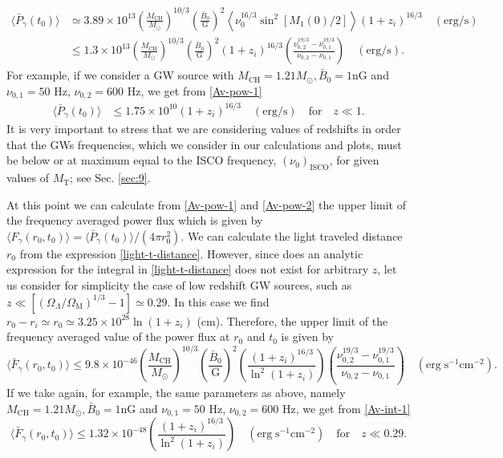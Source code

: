 \documentclass[a4paper,11pt]{article}
\begin{document}
\begin{align}\label{Av-pow-1}
\langle \bar P_\gamma(t_0) \rangle & \simeq 3.89\times 10^{13} \left(\frac{M_\text{CH}}{M_\odot}\right)^{10/3}\left(\frac{\bar B_0}{\text{G}}\right)^2 \left\langle \nu_0^{16/3}\sin^2[M_1(0)/2] \right\rangle (1+z_i)^{16/3} \quad (\text{erg}/\text{s}) \nonumber\\
& \leq 1.3\times 10^{13} \left(\frac{M_\text{CH}}{M_\odot}\right)^{10/3}\left(\frac{\bar B_0}{\text{G}}\right)^2  (1+z_i)^{16/3}\left( \frac{ \nu_{0, 2}^{19/3} - \nu_{0, 1}^{19/3}}{ \nu_{0, 2} - \nu_{0, 1}}\right)      \quad (\text{erg}/\text{s}).
\end{align}
For example, if we consider a GW source with $M_\text{CH}=1.21 M_\odot, \bar B_0=1 \text{nG}$ and $\nu_{0, 1}=50$ Hz, $\nu_{0, 2}=600$ Hz, we get from \eqref{Av-pow-1}
\begin{align}\label{Av-pow-2}
\langle \bar P_\gamma(t_0) \rangle & \leq 1.75\times 10^{10}  (1+z_i)^{16/3}   \quad (\text{erg}/\text{s}) \quad \text{for} \quad z\ll 1.
\end{align}
It is very important to stress that we are considering values of redshifts in order that the GWs frequencies, which we consider in our calculations and plots, must be below or at maximum equal to the ISCO frequency, $(\nu_0)_\text{ISCO}$, for given values of $M_\text{T}$; see Sec. \ref{sec:9}.

At this point we can calculate from \eqref{Av-pow-1} and \eqref{Av-pow-2} the upper limit of the frequency averaged power flux which is given by $\langle F_\gamma(r_0, t_0)\rangle =\langle \bar P_\gamma(t_0) \rangle/(4\pi r_0^2)$. We can calculate the light traveled distance $r_0$ from the expression \eqref{light-t-distance}. However, since does an analytic expression for the integral in \eqref{light-t-distance} does not exist for arbitrary $z$, let us consider for simplicity the case of low redshift GW sources, such as $z\ll \left[(\Omega_\Lambda/\Omega_\textrm{M})^{1/3}-1\right]\simeq 0.29$. In this case we find $r_0-r_i\simeq r_0 \simeq 3.25\times 10^{28}\ln(1+z_i)$ (cm). Therefore, the upper limit of the frequency averaged value of the power flux at $r_0$ and $t_0$ is given by
\begin{equation}\label{Av-int-1}
\langle \bar F_\gamma(r_0, t_0) \rangle \leq 9.8\times 10^{-46} \left(\frac{M_\text{CH}}{M_\odot}\right)^{10/3}\left(\frac{\bar B_0}{\text{G}}\right)^2 \left( \frac{(1+z_i)^{16/3}}{\ln^2(1+z_i)} \right) \left( \frac{ \nu_{0, 2}^{19/3} - \nu_{0, 1}^{19/3}}{ \nu_{0, 2} - \nu_{0, 1}}\right)      \quad (\text{erg}\; \text{s}^{-1} \text{cm}^{-2}).
\end{equation}
If we take again, for example, the same parameters as above, namely $M_\text{CH}=1.21 M_\odot, \bar B_0=1 \text{nG}$ and $\nu_{0, 1}=50$ Hz, $\nu_{0, 2}=600$ Hz, we get from \eqref{Av-int-1}
\begin{equation}\label{Av-int-2}
\langle \bar F_\gamma(r_0, t_0) \rangle \leq 1.32\times 10^{-48} \left( \frac{(1+z_i)^{16/3}}{\ln^2(1+z_i)} \right)\quad  (\text{erg}\; \text{s}^{-1} \text{cm}^{-2}) \quad \text{for} \quad z\ll 0.29.
\end{equation}
\end{document}
